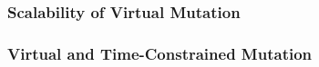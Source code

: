 
\subsubsection{Scalability of Virtual Mutation}
\label{sec:empirical-study-RQ-mutants-tests}



\subsubsection{Virtual and Time-Constrained Mutation}
\label{sec:empirical-study-RQ-virtual-time-constrained-virtual}



